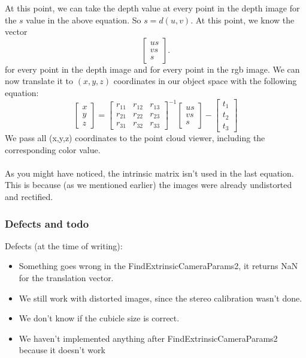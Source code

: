 At this point, we can take the depth value at every point in the depth image for
the $s$ value in the above equation. So $s = d(u,v)$. At this point, we know
the vector $$
\left[ \begin{array}{ccc} 
u s\\
v s\\
s \end{array} \right].
$$ for every point in the depth image and for every point in the rgb image. We 
can now translate it to $(x,y,z)$ coordinates in our object space with the 
following equation:
$$
\left[ \begin{array}{c} 
x\\
y\\
z\end{array} \right] 
=
\left[ \begin{array}{ccc} 
r_{11} & r_{12} & r_{13}\\
r_{21} & r_{22} & r_{23}\\
r_{31} & r_{32} & r_{33}
\end{array} \right]^{-1}
\left[ \begin{array}{c} 
u s\\
v s\\
s \end{array} \right]
-
\left[ \begin{array}{c} 
t_{1}\\
t_{2}\\
t_{3}
\end{array} \right]
$$
We pass all (x,y,z) coordinates to the point cloud viewer, including 
the corresponding color value. \\
\\
As you might have noticed, the intrinsic matrix isn't used in the last equation.
This is because (as we mentioned earlier) the images were already undistorted
and rectified.

\subsubsection{Defects and todo}

Defects (at the time of writing):

\begin{itemize}

\item Something goes wrong in the FindExtrinsicCameraParams2, it returns NaN for the translation vector.

\item We still work with distorted images, since the stereo calibration wasn't done.

\item We don't know if the cubicle size is correct.

\item We haven't implemented anything after FindExtrinsicCameraParams2 because it doesn't work

\end{itemize}


